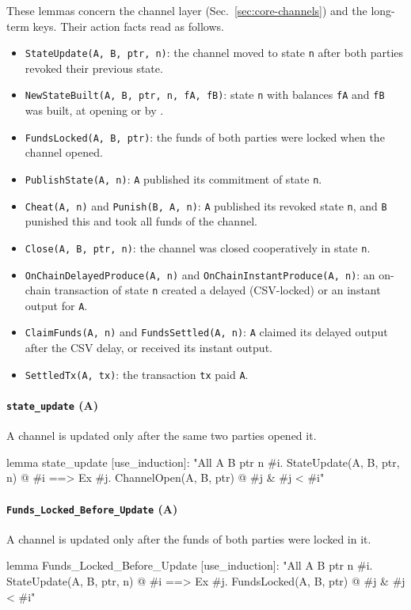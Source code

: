 These lemmas concern the channel layer (Sec.~\ref{sec:core-channels}) and the long-term keys.
Their action facts read as follows.
{\raggedright
\begin{itemize}
  \item \texttt{StateUpdate(A, B, ptr, n)}: the channel moved to state \texttt{n} after both
    parties revoked their previous state.
  \item \texttt{NewStateBuilt(A, B, ptr, n, fA, fB)}: state \texttt{n} with balances
    \texttt{fA} and \texttt{fB} was built, at opening or by .
  \item \texttt{FundsLocked(A, B, ptr)}: the funds of both parties were locked when the channel
    opened.
  \item \texttt{PublishState(A, n)}: \texttt{A} published its commitment of state \texttt{n}.
  \item \texttt{Cheat(A, n)} and \texttt{Punish(B, A, n)}: \texttt{A} published its revoked
    state \texttt{n}, and \texttt{B} punished this and took all funds of the channel.
  \item \texttt{Close(A, B, ptr, n)}: the channel was closed cooperatively in state \texttt{n}.
  \item \texttt{OnChainDelayedProduce(A, n)} and \texttt{OnChainInstantProduce(A, n)}: an
    on-chain transaction of state \texttt{n} created a delayed (CSV-locked) or an instant output
    for \texttt{A}.
  \item \texttt{ClaimFunds(A, n)} and \texttt{FundsSettled(A, n)}: \texttt{A} claimed its delayed
    output after the CSV delay, or received its instant output.
  \item \texttt{SettledTx(A, tx)}: the transaction \texttt{tx} paid \texttt{A}.
\end{itemize}
\par}

\paragraph{\texttt{state\_update} (A)}
A channel is updated only after the same two parties opened it.
\begin{spthy}
lemma state_update [use_induction]:
    "All A B ptr n #i.
       StateUpdate(A, B, ptr, n) @ #i
     ==> Ex #j. ChannelOpen(A, B, ptr) @ #j & #j < #i"
\end{spthy}

\paragraph{\texttt{Funds\_Locked\_Before\_Update} (A)}
A channel is updated only after the funds of both parties were locked in it.
\begin{spthy}
lemma Funds_Locked_Before_Update [use_induction]:
    "All A B ptr n #i.
       StateUpdate(A, B, ptr, n) @ #i
     ==> Ex #j. FundsLocked(A, B, ptr) @ #j & #j < #i"
\end{spthy}


